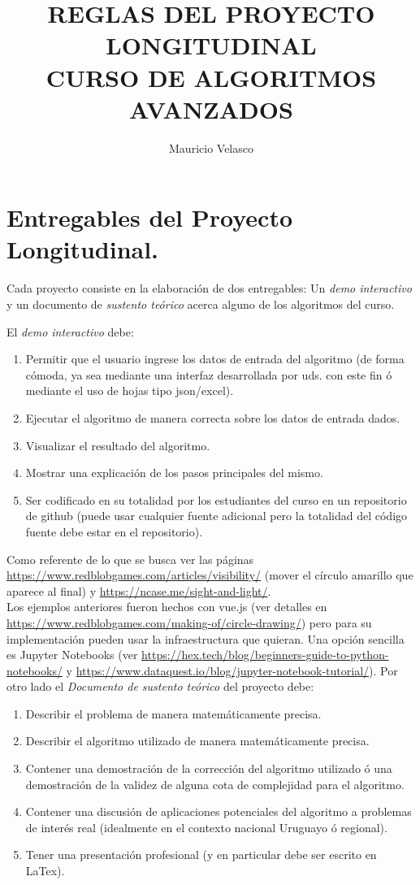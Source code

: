 \documentclass[12pt, a4paper]{article}
\date{}
\begin{document}
\title{REGLAS DEL PROYECTO LONGITUDINAL\\ CURSO DE ALGORITMOS AVANZADOS}
\author{Mauricio Velasco}
\maketitle
\section{Entregables del Proyecto Longitudinal.}

Cada proyecto consiste en la elaboraci\'on de dos entregables: Un {\it demo interactivo} y un documento de {\it sustento te\'orico} acerca alguno de los algoritmos del curso. 

\noindent
El {\it demo interactivo} debe:
\begin{enumerate}
\item Permitir que el usuario ingrese los datos de entrada del algoritmo (de forma c\'omoda, ya sea mediante una interfaz desarrollada por uds. con este fin \'o mediante el uso de hojas tipo json/excel).
\item Ejecutar el algoritmo de manera correcta sobre los datos de entrada dados.
\item Visualizar el resultado del algoritmo.
\item Mostrar una explicaci\'on de los pasos principales del mismo.
\item Ser codificado en su totalidad por los estudiantes del curso en un repositorio de github (puede usar cualquier fuente adicional pero la totalidad del c\'odigo fuente debe estar en el repositorio).
\end{enumerate}
Como referente de lo que se busca ver las p\'aginas 
 \url{https://www.redblobgames.com/articles/visibility/} (mover el c\'irculo amarillo que aparece al final) y \url{https://ncase.me/sight-and-light/}.\\
Los ejemplos anteriores fueron hechos con {\rm vue.js} (ver detalles en \url{https://www.redblobgames.com/making-of/circle-drawing/}) pero para su implementaci\'on pueden usar la infraestructura que quieran. Una opci\'on sencilla es Jupyter Notebooks (ver \url{https://hex.tech/blog/beginners-guide-to-python-notebooks/} y \url{https://www.dataquest.io/blog/jupyter-notebook-tutorial/}).
\newpage
Por otro lado el {\it Documento de sustento te\'orico} del proyecto debe:
\begin{enumerate}
\item Describir el problema de manera matem\'aticamente precisa.
\item Describir el algoritmo utilizado de manera matem\'aticamente precisa.
\item Contener una demostraci\'on de la correcci\'on del algoritmo utilizado \'o una demostraci\'on de la validez de alguna cota de complejidad para el algoritmo.
\item Contener una discusi\'on de aplicaciones potenciales del algoritmo a problemas de inter\'es real (idealmente en el contexto nacional Uruguayo \'o regional).
\item Tener una presentaci\'on profesional (y en particular debe ser escrito en LaTex).
\end{enumerate}
\end{document}
